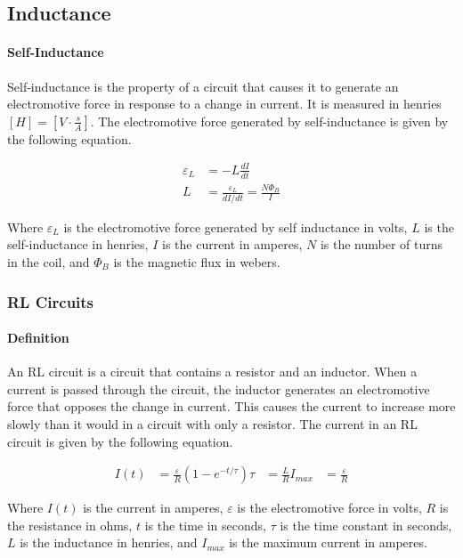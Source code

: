 \subsection{Inductance}
\hrulefill

\paragraph*{Self-Inductance}
Self-inductance is the property of a circuit that causes it to generate an electromotive force in response to a change in current. It is measured in henries $[H] = [V\cdot \frac{s}{A}]$. The electromotive force generated by self-inductance is given by the following equation.

\begin{align*}
    \varepsilon_L &= -L\frac{dI}{dt}\\
    L &= \frac{\varepsilon_L}{dI/dt} = \frac{N\Phi_B}{I}
\end{align*}

Where $\varepsilon_L$ is the electromotive force generated by self inductance in volts, $L$ is the self-inductance in henries, $I$ is the current in amperes, $N$ is the number of turns in the coil, and $\Phi_B$ is the magnetic flux in webers.\\

\subsubsection*{RL Circuits}
\paragraph*{Definition}
An RL circuit is a circuit that contains a resistor and an inductor. When a current is passed through the circuit, the inductor generates
an electromotive force that opposes the change in current. This causes the current to increase more slowly than it would in a circuit with
only a resistor. The current in an RL circuit is given by the following equation.

\begin{align*}
    I(t) &= \frac{\varepsilon}{R}(1 - e^{-t/\tau})
    \tau &= \frac{L}{R}
    I_{max} &= \frac{\varepsilon}{R} 
\end{align*}

Where $I(t)$ is the current in amperes, $\varepsilon$ is the electromotive force in volts, $R$ is the resistance in ohms, $t$ is the time in seconds,
$\tau$ is the time constant in seconds, $L$ is the inductance in henries, and $I_{max}$ is the maximum current in amperes.\\


